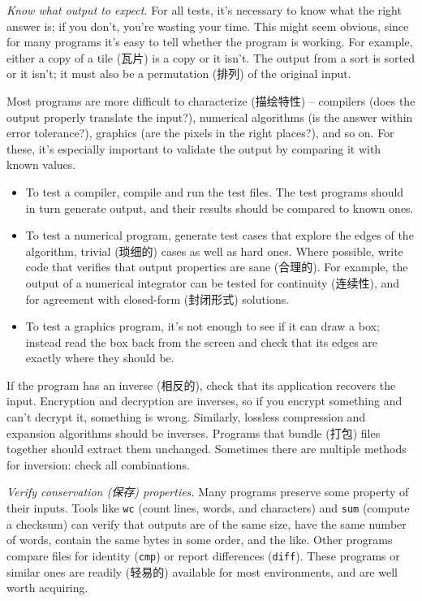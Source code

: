 \emph{Know what output to expect.} For all tests, it's necessary to know
what the right answer is; if you don't, you're wasting your time. This
might seem obvious, since for many programs it's easy to tell whether the
program is working. For example, either a copy of a tile (瓦片) is a copy
or it isn't. The output from a sort is sorted or it isn't; it must also be
a permutation (排列) of the original input.

Most programs are more difficult to characterize (描绘特性) -- compilers
(does the output properly translate the input?), numerical algorithms (is
the answer within error tolerance?), graphics (are the pixels in the right
places?), and so on. For these, it's especially important to validate the
output by comparing it with known values.
\begin{itemize}
    \item To test a compiler, compile and run the test files. The test
        programs should in turn generate output, and their results should
        be compared to known ones.
    \item To test a numerical program, generate test cases that explore the
        edges of the algorithm, trivial (琐细的) cases as well as hard
        ones. Where possible, write code that verifies that output
        properties are sane (合理的). For example, the output of a
        numerical integrator can be tested for continuity (连续性), and for
        agreement with closed-form (封闭形式) solutions.
    \item To test a graphics program, it's not enough to see if it can draw
        a box; instead read the box back from the screen and check that its
        edges are exactly where they should be.
\end{itemize}

If the program has an inverse (相反的), check that its application recovers
the input.  Encryption and decryption are inverses, so if you encrypt
something and can't decrypt it, something is wrong. Similarly, lossless
compression and expansion algorithms should be inverses. Programs that
bundle (打包) files together should extract them unchanged. Sometimes there
are multiple methods for inversion: check all combinations.

\emph{Verify conservation (保存) properties.} Many programs preserve some
property of their inputs. Tools like \texttt{wc} (count lines, words, and
characters) and \texttt{sum} (compute a checksum) can verify that outputs
are of the same size, have the same number of words, contain the same bytes
in some order, and the like. Other programs compare files for identity
(\texttt{cmp}) or report differences (\texttt{diff}). These programs or
similar ones are readily (轻易的) available for most environments, and are
well worth acquiring.


